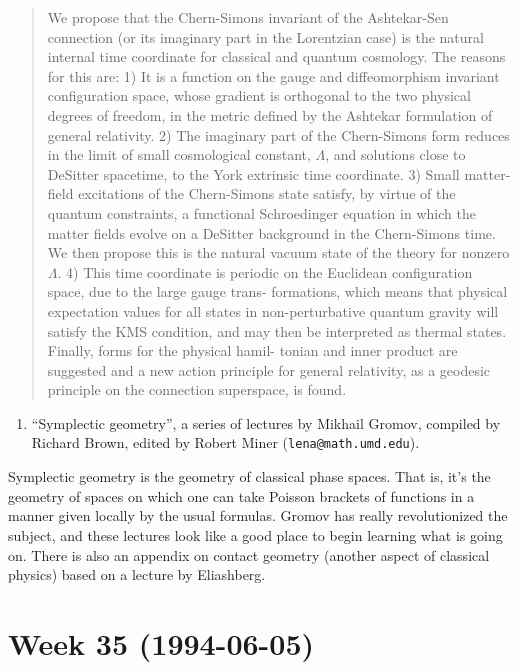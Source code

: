 \documentclass{article}
\def\tightlist{}
\begin{document}
\begin{quote}
We propose that the Chern-Simons invariant of the Ashtekar-Sen
connection (or its imaginary part in the Lorentzian case) is the natural
internal time coordinate for classical and quantum cosmology. The
reasons for this are: 1) It is a function on the gauge and
diffeomorphism invariant configuration space, whose gradient is
orthogonal to the two physical degrees of freedom, in the metric defined
by the Ashtekar formulation of general relativity. 2) The imaginary part
of the Chern-Simons form reduces in the limit of small cosmological
constant, \(\Lambda\), and solutions close to DeSitter spacetime, to the
York extrinsic time coordinate. 3) Small matter-field excitations of the
Chern-Simons state satisfy, by virtue of the quantum constraints, a
functional Schroedinger equation in which the matter fields evolve on a
DeSitter background in the Chern-Simons time. We then propose this is
the natural vacuum state of the theory for nonzero \(\Lambda\). 4) This
time coordinate is periodic on the Euclidean configuration space, due to
the large gauge trans- formations, which means that physical expectation
values for all states in non-perturbative quantum gravity will satisfy
the KMS condition, and may then be interpreted as thermal states.
Finally, forms for the physical hamil- tonian and inner product are
suggested and a new action principle for general relativity, as a
geodesic principle on the connection superspace, is found.
\end{quote}

\begin{enumerate}
\def\labelenumi{\arabic{enumi})}
\setcounter{enumi}{4}
\tightlist
\item
  ``Symplectic geometry'', a series of lectures by Mikhail Gromov,
  compiled by Richard Brown, edited by Robert Miner
  (\texttt{lena@math.umd.edu}).
\end{enumerate}

Symplectic geometry is the geometry of classical phase spaces. That is,
it's the geometry of spaces on which one can take Poisson brackets of
functions in a manner given locally by the usual formulas. Gromov has
really revolutionized the subject, and these lectures look like a good
place to begin learning what is going on. There is also an appendix on
contact geometry (another aspect of classical physics) based on a
lecture by Eliashberg.
\hypertarget{week-35-1994-06-05}{%
\section{Week 35 (1994-06-05)}\label{week-35-1994-06-05}}
\end{document}
